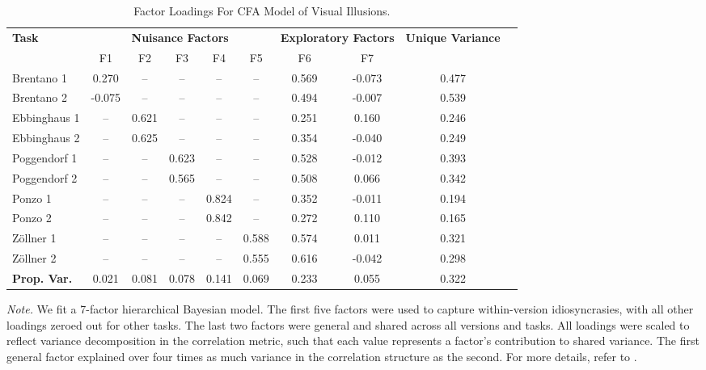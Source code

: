 \begin{table}[ht]
\centering
\caption{Factor Loadings For CFA Model of Visual Illusions.}
\label{tab:loadings-new}
\begin{tabular}{lccccccccl}
\toprule
\textbf{Task} & \multicolumn{5}{c}{\textbf{Nuisance Factors}} & \multicolumn{2}{c}{\textbf{Exploratory Factors}} & \textbf{Unique Variance} \\
\cmidrule(lr){2-6} \cmidrule(lr){7-8}
 & F1 & F2 & F3 & F4 & F5 & F6 & F7 & \\
\midrule
Brentano 1   & 0.270 & --    & --    & --    & --    & 0.569 & -0.073 & 0.477 \\
Brentano 2   & -0.075 & --   & --    & --    & --    & 0.494 & -0.007 & 0.539 \\
Ebbinghaus 1 & --    & 0.621 & --    & --    & --    & 0.251 &  0.160 & 0.246 \\
Ebbinghaus 2 & --    & 0.625 & --    & --    & --    & 0.354 & -0.040 & 0.249 \\
Poggendorf 1 & --    & --    & 0.623 & --    & --    & 0.528 & -0.012 & 0.393 \\
Poggendorf 2 & --    & --    & 0.565 & --    & --    & 0.508 &  0.066 & 0.342 \\
Ponzo 1      & --    & --    & --    & 0.824 & --    & 0.352 & -0.011 & 0.194 \\
Ponzo 2      & --    & --    & --    & 0.842 & --    & 0.272 &  0.110 & 0.165 \\
Zöllner 1    & --    & --    & --    & --    & 0.588 & 0.574 &  0.011 & 0.321 \\
Zöllner 2    & --    & --    & --    & --    & 0.555 & 0.616 & -0.042 & 0.298 \\
\midrule
\textbf{Prop. Var.} & 0.021 & 0.081 & 0.078 & 0.141 & 0.069 & 0.233 & 0.055 & 0.322 \\
\bottomrule
\end{tabular}

\vspace{0.5em}
\raggedright
\footnotesize
\textit{Note.} We fit a 7-factor hierarchical Bayesian model. The first five factors were used to capture within-version idiosyncrasies, with all other loadings zeroed out for other tasks. The last two factors were general and shared across all versions and tasks. All loadings were scaled to reflect variance decomposition in the correlation metric, such that each value represents a factor’s contribution to shared variance. The first general factor explained over four times as much variance in the correlation structure as the second. For more details, refer to \textcite{Rouder.etal.2024a}.
\end{table}
